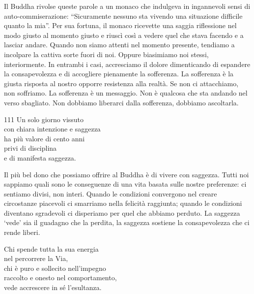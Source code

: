 \begin{dhpRefl}
Il Buddha rivolse queste parole a un monaco che indulgeva in ingannevoli sensi di auto-commiserazione: ``Sicuramente nessuno sta vivendo una situazione difficile quanto la mia''. Per sua fortuna, il monaco ricevette una saggia riflessione nel modo giusto al momento giusto e riuscì così a vedere quel che stava facendo e a lasciar andare. Quando non siamo attenti nel momento presente, tendiamo a incolpare la cattiva sorte fuori di noi. Oppure biasimiamo noi stessi, interiormente.  In entrambi i casi, accresciamo il dolore dimenticando di espandere la consapevolezza e di accogliere pienamente la sofferenza. La sofferenza \`{e} la giusta risposta al nostro opporre resistenza alla realt\`{a}. Se non ci attacchiamo, non soffriamo. La sofferenza \`{e} un messaggio. Non \`{e} qualcosa che sta andando nel verso sbagliato. Non dobbiamo liberarci dalla sofferenza, dobbiamo ascoltarla.
\end{dhpRefl}


\begin{dhpVerse}{111}
\label{dhp-111}
Un solo giorno vissuto\\
con chiara intenzione e saggezza\\
ha più valore di cento anni\\
privi di disciplina\\
e di manifesta saggezza.
\end{dhpVerse}

\begin{dhpRefl}
Il più bel dono che possiamo offrire al Buddha \`{e} di vivere con saggezza. Tutti noi sappiamo quali sono le conseguenze di una vita basata sulle nostre preferenze: ci sentiamo divisi, non interi. Quando le condizioni convergono nel creare circostanze piacevoli ci smarriamo nella felicit\`{a} raggiunta; quando le condizioni diventano sgradevoli ci disperiamo per quel che abbiamo perduto. La saggezza `vede' sia il guadagno che la perdita, la saggezza sostiene la consapevolezza che ci rende liberi.
\end{dhpRefl}


\begin{dhpVerse}{24}
\label{dhp-24}
Chi spende tutta la sua energia\\
nel percorrere la Via,\\
chi \`{e} puro e sollecito nell'impegno\\
raccolto e onesto nel comportamento,\\
vede accrescere in s\'{e} l'esultanza.
\end{dhpVerse}

